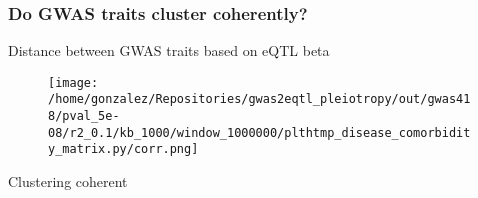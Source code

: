 \documentclass{beamer}
\begin{document}
\begin{frame}
\frametitle{Do GWAS traits cluster coherently?}

Distance between GWAS traits based on eQTL beta

\begin{figure}[!]
\texttt{[image: /home/gonzalez/Repositories/gwas2eqtl\_pleiotropy/out/gwas418/pval\_5e-08/r2\_0.1/kb\_1000/window\_1000000/plthtmp\_disease\_comorbidity\_matrix.py/corr.png]}
\end{figure}

Clustering coherent

\end{frame}



\end{document}
